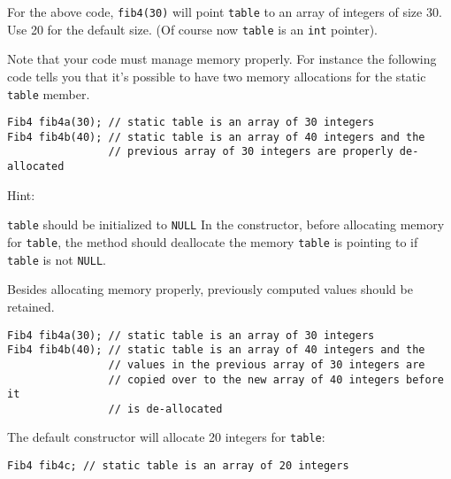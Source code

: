 
For the above code, \verb!fib4(30)! will point \verb!table! to an array of integers of size 30. Use 20 for the
default size. (Of course now \verb!table! is an \verb!int! pointer).

Note that your code must manage memory properly. For instance the following code tells you that it's
possible to have two memory allocations for the static \verb!table! member.

\begin{Verbatim}[frame=single]
Fib4 fib4a(30); // static table is an array of 30 integers
Fib4 fib4b(40); // static table is an array of 40 integers and the
                // previous array of 30 integers are properly de-allocated
\end{Verbatim}

Hint:
\begin{tightlist}
  \li \verb!table! should be initialized to \verb!NULL!
  \li In the constructor, before allocating memory for \verb!table!, the method should deallocate the
  memory \verb!table! is pointing to if \verb!table! is not \verb!NULL!.
\end{tightlist}

Besides allocating memory properly, previously computed values should be retained.

\begin{Verbatim}[frame=single]
Fib4 fib4a(30); // static table is an array of 30 integers
Fib4 fib4b(40); // static table is an array of 40 integers and the
                // values in the previous array of 30 integers are
                // copied over to the new array of 40 integers before it
                // is de-allocated
\end{Verbatim}

The default constructor will allocate 20 integers for \verb!table!:
\begin{Verbatim}[frame=single]
Fib4 fib4c; // static table is an array of 20 integers
\end{Verbatim}


